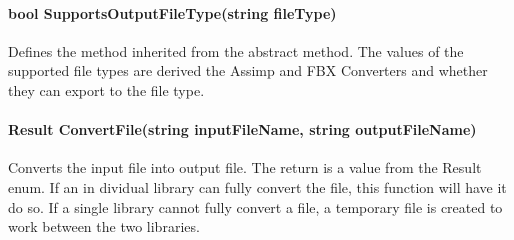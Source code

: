         \paragraph{bool SupportsOutputFileType(string fileType)}
            \hfill \break
            Defines the method inherited from the abstract method.  The values of the supported file types are derived the Assimp and FBX Converters and whether they can export to the file type.

        \paragraph{Result ConvertFile(string inputFileName, string outputFileName)}
            \hfill \break
            Converts the input file into output file.  The return is a value from the Result enum.  If an in dividual library can fully convert the file, this function will have it do so.  If a single library cannot fully convert a file, a temporary file is created to work between the two libraries.
        
        